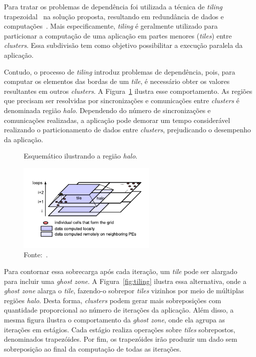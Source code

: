 Para tratar os problemas de dependência foi utilizada a técnica de
\textit{tiling} trapezoidal~\cite{meng11} na solução proposta, resultando em redundância de
dados e computações~\cite{Rocha:2017}. Mais especificamente, \textit{tiling} é
geralmente utilizado para particionar a computação de uma aplicação \stencil em
partes menores (\textit{tiles}) entre \textit{clusters}. Essa subdivisão
tem como objetivo possibilitar a execução paralela da aplicação.

Contudo, o processo de \textit{tiling} introduz problemas de dependência, pois,
para computar os elementos das bordas de um \textit{tile}, é necessário obter
os valores resultantes em outros \textit{clusters}. A Figura~\ref{fig:tilingHalo} ilustra
esse comportamento. As regiões que precisam ser resolvidas por sincronizações e
comunicações entre \textit{clusters} é denominada região \textit{halo}. Dependendo do número
de sincronizações e comunicações realizadas, a aplicação pode demorar um tempo
considerável realizando o particionamento de dados entre \textit{clusters}, prejudicando o
desempenho da aplicação.

\begin{figure}[!h]
	\centering
    \caption{Esquemático ilustrando a região \textit{halo}.}
    \includegraphics[width=0.6\textwidth]{figs/tilingHalo.pdf}
    \caption*{Fonte:~\cite{meng11}.}
    \label{fig:tilingHalo}
\end{figure}



Para contornar essa sobrecarga após cada iteração, um \textit{tile} pode ser
alargado para incluir uma \textit{ghost zone}. A Figura~\ref{fig:tiling} ilustra
essa alternativa, onde a \textit{ghost zone} alarga o \textit{tile}, fazendo-o
sobrepor \textit{tiles} vizinhos por meio de múltiplas regiões \textit{halo}.
Desta forma, \textit{clusters} podem gerar mais sobreposições com quantidade proporcional ao
número de iterações da aplicação. Além disso, a mesma figura ilustra o
comportamento da \textit{ghost zone}, onde ela agrupa as iterações em estágios.
Cada estágio realiza operações sobre \textit{tiles} sobrepostos, denominados
trapezóides. Por fim, os trapezóides irão produzir um dado sem sobreposição ao
final da computação de todas as iterações.

